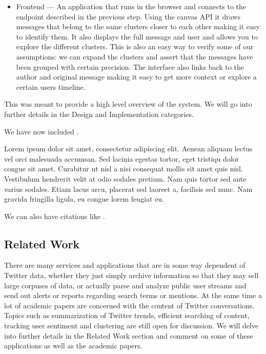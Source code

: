 \begin{itemize}
	\item Frontend --- An application that runs in the browser and connects to the endpoint described in the previous step. Using the canvas API it draws messages that belong to the same clusters closer to each other making it easy to identify them. It also displays the full message and user and allows you to explore the different clusters. This is also an easy way to verify some of our assumptions: we can expand the clusters and assert that the messages have been grouped with certain precision. The interface also links back to the author and original message making it easy to get more context or explore a certain users timeline.
\end{itemize}
This was meant to provide a high level overview of the system. We will go into further details in the Design and Implementation categories.

We have now included .



Lorem ipsum dolor sit amet, consectetur adipiscing elit. Aenean aliquam lectus vel orci malesuada accumsan. Sed lacinia egestas tortor, eget tristiqu dolor congue sit amet. Curabitur ut nisl a nisi consequat mollis sit amet quis nisl. Vestibulum hendrerit velit at odio sodales pretium. Nam quis tortor sed ante varius sodales. Etiam lacus arcu, placerat sed laoreet a, facilisis sed nunc. Nam gravida fringilla ligula, eu congue lorem feugiat eu.

We can also have citations like \cite{iso-odf}.

\subsection{Related Work}

There are many services and applications that are in some way dependent of Twitter data, whether they just simply archive information so that they may sell large corpuses of data, or actually parse and analyze public user streams and send out alerts or reports regarding search terms or mentions.
\newline
At the same time a lot of academic papers are concerned with the content of Twitter conversations. Topics such as summarization of Twitter trends, efficient searching of content, tracking user sentiment and clustering are still open for discussion.
\newline
We will delve into further details in the Related Work section and comment on some of these applications as well as the academic papers.

